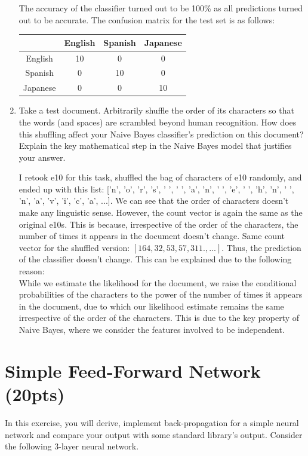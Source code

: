 \documentclass[a4paper]{article}
\theoremstyle{definition}
\newenvironment{soln}{
    \leavevmode\color{blue}\ignorespaces
}{}
\begin{document}
\begin{enumerate}
\begin{soln}
    The accuracy of the classifier turned out to be 100\% as all predictions turned out to be accurate. The confusion matrix for the test set is as follows:\\
    \begin{center}
\begin{tabular}{c|ccc}
& English & Spanish & Japanese \\
\hline
English & 10 & 0 & 0\\
Spanish & 0 & 10 & 0\\
Japanese& 0 & 0 & 10
\end{tabular}
\end{center}
\end{soln}
\item Take a test document.   Arbitrarily shuffle the order of its characters so that the words (and spaces) are scrambled beyond human recognition.  How does this shuffling affect your Naive Bayes classifier's prediction on this document?  Explain the key mathematical step in the Naive Bayes model that justifies your answer.\\
\begin{soln}
    I retook e10 for this task, shuffled the bag of characters of e10 randomly, and ended up with this list: ['n', 'o', 'r', 's', ' ', ' ', 'a', 'n', ' ', 'e', ' ', 'h', 'n', ' ', 'n', 'a', 'v', 'i', 'c', 'a', ...]. We can see that the order of characters doesn't make any linguistic sense. However, the count vector is again the same as the original e10s. This is because, irrespective of the order of the characters, the number of times it appears in the document doesn't change. Same count vector for the shuffled version: $[164, 32, 53, 57, 311., ...]$. Thus, the prediction of the classifier doesn't change. This can be explained due to the following reason:\\
    While we estimate the likelihood for the document, we raise the conditional probabilities of the characters to the power of the number of times it appears in the document, due to which our likelihood estimate remains the same irrespective of the order of the characters. This is due to the key property of Naive Bayes, where we consider the features involved to be independent.
\end{soln}
\end{enumerate}

\section{Simple Feed-Forward Network (20pts)}
In this exercise, you will derive, implement back-propagation for a simple neural network and compare your output with some standard library’s output. Consider the following 3-layer neural network.
\end{document}
